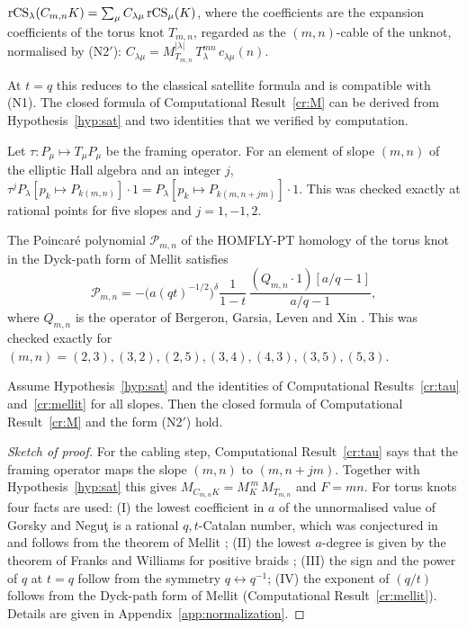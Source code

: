 \begin{hypothesis}\label{hyp:sat}
$\mathrm{rCS}_\lambda(C_{m,n}K)=\sum_\mu C_{\lambda\mu}\,\mathrm{rCS}_\mu(K)$, where the coefficients are the expansion coefficients of the torus knot $T_{m,n}$,
regarded as the $(m,n)$-cable of the unknot, normalised by {\rm(N2$'$)}: $C_{\lambda\mu}=M_{T_{m,n}}^{|\lambda|}\,T_\lambda^{mn}\,c_{\lambda\mu}(n)$.
\end{hypothesis}
At $t=q$ this reduces to the classical satellite formula and is compatible with (N1).
The closed formula of Computational Result~\ref{cr:M} can be derived from Hypothesis~\ref{hyp:sat} and two identities that we verified by computation.
\begin{compresult}\label{cr:tau}
Let $\tau:P_\mu\mapsto T_\mu P_\mu$ be the framing operator. For an element of slope $(m,n)$ of the elliptic Hall algebra and an integer $j$,
$\tau^jP_\lambda[p_k\mapsto P_{k(m,n)}]\cdot1=P_\lambda[p_k\mapsto P_{k(m,n+jm)}]\cdot1$.
This was checked exactly at rational points for five slopes and $j=1,-1,2$.
\end{compresult}
\begin{compresult}\label{cr:mellit}
The Poincar\'e polynomial $\mathcal{P}_{m,n}$ of the HOMFLY-PT homology of the torus knot in the Dyck-path form of Mellit \cite[Thm.~3.1]{Mellit17} satisfies
\[
\mathcal{P}_{m,n}=-\bigl(a(qt)^{-1/2}\bigr)^{\delta}\frac{1}{1-t}\,\frac{(Q_{m,n}\cdot1)[a/q-1]}{a/q-1},
\]
where $Q_{m,n}$ is the operator of Bergeron, Garsia, Leven and Xin \cite{Bergeron14}.
This was checked exactly for $(m,n)=(2,3),(3,2),(2,5),(3,4),(4,3),(3,5),(5,3)$.
\end{compresult}
\begin{proposition}\label{thm:M}
Assume Hypothesis~\ref{hyp:sat} and the identities of Computational Results~\ref{cr:tau} and~\ref{cr:mellit} for all slopes.
Then the closed formula of Computational Result~\ref{cr:M} and the form {\rm(N2$'$)} hold.
\end{proposition}
\begin{proof}[Sketch of proof]
For the cabling step, Computational Result~\ref{cr:tau} says that the framing operator maps the slope $(m,n)$ to $(m,n+jm)$.
Together with Hypothesis~\ref{hyp:sat} this gives $M_{C_{m,n}K}=M_K^{\,m}\,M_{T_{m,n}}$ and $F=mn$.
For torus knots four facts are used:
(I) the lowest coefficient in $a$ of the unnormalised value of Gorsky and Negu\c{t} is a rational $q,t$-Catalan number, which was conjectured in \cite{Gorsky13b} and follows from the theorem of Mellit \cite{Mellit16};
(II) the lowest $a$-degree is given by the theorem of Franks and Williams for positive braids \cite{Franks87};
(III) the sign and the power of $q$ at $t=q$ follow from the symmetry $q\leftrightarrow q^{-1}$;
(IV) the exponent of $(q/t)$ follows from the Dyck-path form of Mellit (Computational Result~\ref{cr:mellit}).
Details are given in Appendix~\ref{app:normalization}.
\end{proof}
